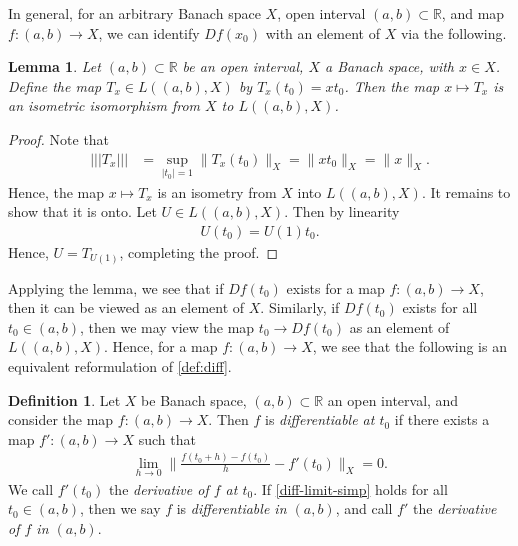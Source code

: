 \documentclass[12pt,reqno]{amsart}
\numberwithin{equation}{section}  %
\numberwithin{figure}{section}
\newcommand{\rr}{\mathbb{R}}
\theoremstyle{plain}
\newtheorem{lemma}{Lemma}
\theoremstyle{definition}
\newtheorem{definition}{Definition}
\theoremstyle{remark}
\begin{document}
%
%
In general, for an arbitrary Banach space $X$, open interval $(a,b) \subset
\rr$, and map $f:(a,b) \to X$, we can identify $Df(x_0)$ with an
element of $X$ via the following.
%
%
%
%
%
%
%
%
\begin{lemma}
	\label{lem:isometry} Let $(a,b) \subset \rr$ be an open interval, $X$ a Banach
	space, with $x \in X$. Define the map $T_x \in L\left ( (a,b) , X \right )$ by
	$T_x(t_0) = x t_0$. Then the map $x \mapsto T_x$ is an
	isometric isomorphism from
	$X$ to $L((a,b) , X)$. 
\end{lemma}
%
%
\begin{proof} Note that 
%
%
\begin{equation*}
	\begin{split}
		| | | T_x | | |
		& = \sup_{|t_0| = 1} \| T_x (t_0) \|_X
		= \| x t_0\|_X
		= \|x\|_X.
	\end{split}
\end{equation*}
%
%
Hence, the map $x \mapsto T_x$ is an isometry from $X$ into $L((a,b),
X)$. It remains to show that it is onto. Let $U \in L( (a,b), X)$. Then
by linearity
%
%
\begin{equation*}
	\begin{split}
		U(t_0) = U(1)t_0. 
	\end{split}
\end{equation*}
%
%
Hence, $U = T_{U(1)}$, completing the proof. 
\end{proof}
%
%
Applying the lemma, we see that if $Df(t_0)$ exists for a map $f: (a,b) \to X$,
then it can be viewed as an
element of $X$. Similarly, if $Df(t_0)$ exists for all $t_0 \in (a,b)$, then
we may view the map $t_0 \to Df(t_0)$ as an
element of $L( (a,b), X)$. Hence, for a
map $f:(a,b) \to X$, we see that the following is an equivalent
reformulation of \autoref{def:diff}. 
\begin{definition}
	\label{def:diff-simp}
	Let $X$ be Banach space, $(a,b) \subset \rr$ an open interval, and
	consider the map $f: (a,b) \to X$.
	Then $f$ is \emph{differentiable at $t_0$} if there exists a map
	$f': (a,b) \to X$ such that 
	\begin{equation}
		\label{diff-limit-simp}
		\begin{split}
			\lim_{h \to 0} \| \frac{f(t_0+ h) - f(t_0) 
			 }{h} - f'(t_0) \|_X = 0.
		\end{split}
	\end{equation}
	We call $f'(t_0)$ the \emph{derivative of $f$ at $t_0$}.
	If \eqref{diff-limit-simp}
	holds for all $t_0 \in (a,b)$, then we say $f$ is \emph{differentiable in
	$(a,b)$}, and call $f'$ the
	\emph{derivative of $f$ in $(a,b)$}.  
\end{definition}
\end{document}
